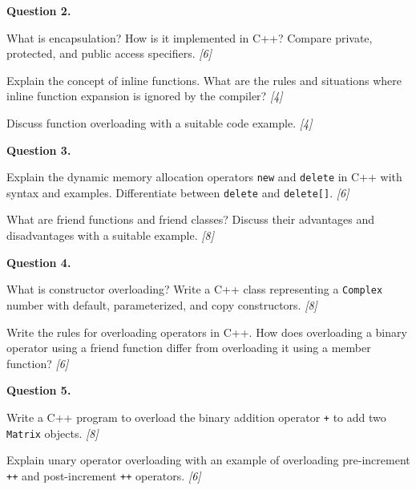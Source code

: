 \documentclass[11pt,a4paper]{article}
\newcommand{\pts}[1]{\hfill   \textit{[#1]}}
\begin{document}
\medskip


\noindent   \textbf{Question 2.}

\begin{parts}
  \item What is encapsulation? How is it implemented in C++? Compare private, protected, and public access specifiers. \pts{6}
  \item Explain the concept of inline functions. What are the rules and situations where inline function expansion is ignored by the compiler? \pts{4}
  \item Discuss function overloading with a suitable code example. \pts{4}
\end{parts}

\medskip


\noindent   \textbf{Question 3.}

\begin{parts}
  \item Explain the dynamic memory allocation operators   \texttt{new} and   \texttt{delete} in C++ with syntax and examples. Differentiate between   \texttt{delete} and   \texttt{delete[]}. \pts{6}
  \item What are friend functions and friend classes? Discuss their advantages and disadvantages with a suitable example. \pts{8}
\end{parts}

\medskip


\noindent   \textbf{Question 4.}

\begin{parts}
  \item What is constructor overloading? Write a C++ class representing a   \texttt{Complex} number with default, parameterized, and copy constructors. \pts{8}
  \item Write the rules for overloading operators in C++. How does overloading a binary operator using a friend function differ from overloading it using a member function? \pts{6}
\end{parts}

\medskip


\noindent   \textbf{Question 5.}

\begin{parts}
  \item Write a C++ program to overload the binary addition operator   \texttt{+} to add two   \texttt{Matrix} objects. \pts{8}
  \item Explain unary operator overloading with an example of overloading pre-increment   \texttt{++} and post-increment   \texttt{++} operators. \pts{6}
\end{parts}
\end{document}
